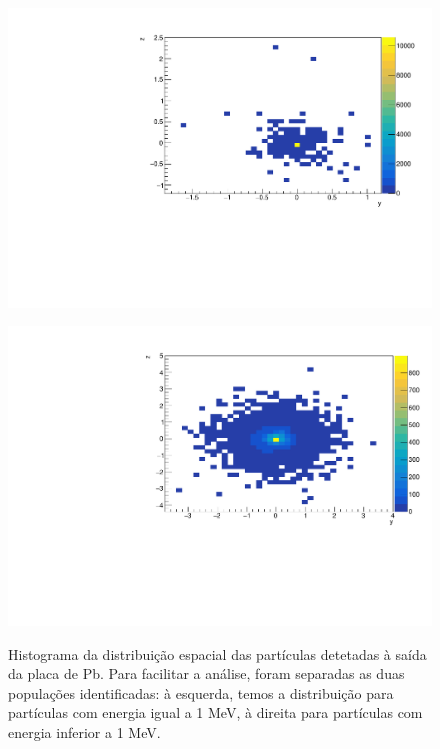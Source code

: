 \documentclass[a4paper, 12pt]{article} %
\begin{document}
	\begin{figure}[H]
		\centering
		\begin{minipage}{0.45\linewidth}
			\includegraphics[width=\linewidth]{dist_zy_1mev.pdf}
			\label{fig:xy_dist_inf1mev}
		\end{minipage}
		\begin{minipage}{0.45\linewidth}
			\centering
			\includegraphics[width=\linewidth]{dist_zy_inf1mev.pdf}
			\label{fig:xy_dist_1mev}
		\end{minipage}

		\caption{Histograma da distribuição espacial das partículas detetadas à saída da placa de Pb. Para facilitar a análise, foram separadas as duas populações identificadas: à esquerda, temos a distribuição para partículas com energia igual a 1 MeV, à direita para partículas com energia inferior a 1 MeV.}
		\label{fig:spacial_dist}
	\end{figure}
\end{document}
